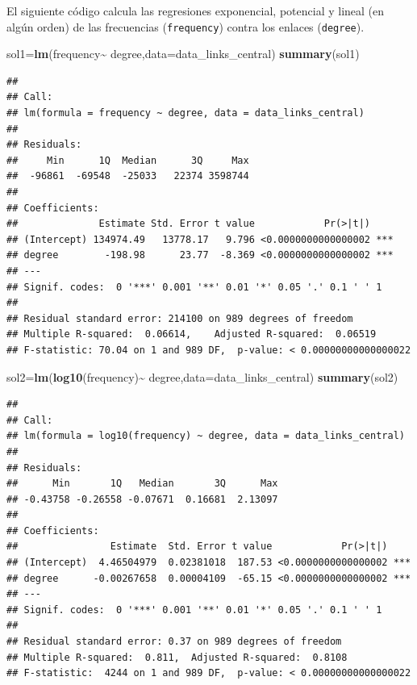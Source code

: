 \documentclass[
]{article}
\newenvironment{Shaded}{\begin{snugshade}}{\end{snugshade}}
\newcommand{\DataTypeTok}[1]{\textcolor[rgb]{0.13,0.29,0.53}{#1}}
\newcommand{\KeywordTok}[1]{\textcolor[rgb]{0.13,0.29,0.53}{\textbf{#1}}}
\newcommand{\NormalTok}[1]{#1}
\newcommand{\OperatorTok}[1]{\textcolor[rgb]{0.81,0.36,0.00}{\textbf{#1}}}
\newcommand{\StringTok}[1]{\textcolor[rgb]{0.31,0.60,0.02}{#1}}
\begin{document}
El siguiente código calcula las regresiones exponencial, potencial y
lineal (en algún orden) de las frecuencias (\texttt{frequency}) contra
los enlaces (\texttt{degree}).

\begin{Shaded}
\begin{Highlighting}[]
\NormalTok{sol1=}\KeywordTok{lm}\NormalTok{(frequency}\OperatorTok{\textasciitilde{}}\StringTok{ }\NormalTok{degree,}\DataTypeTok{data=}\NormalTok{data\_links\_central)}
\KeywordTok{summary}\NormalTok{(sol1)}
\end{Highlighting}
\end{Shaded}

\begin{verbatim}
## 
## Call:
## lm(formula = frequency ~ degree, data = data_links_central)
## 
## Residuals:
##     Min      1Q  Median      3Q     Max 
##  -96861  -69548  -25033   22374 3598744 
## 
## Coefficients:
##              Estimate Std. Error t value            Pr(>|t|)    
## (Intercept) 134974.49   13778.17   9.796 <0.0000000000000002 ***
## degree        -198.98      23.77  -8.369 <0.0000000000000002 ***
## ---
## Signif. codes:  0 '***' 0.001 '**' 0.01 '*' 0.05 '.' 0.1 ' ' 1
## 
## Residual standard error: 214100 on 989 degrees of freedom
## Multiple R-squared:  0.06614,    Adjusted R-squared:  0.06519 
## F-statistic: 70.04 on 1 and 989 DF,  p-value: < 0.00000000000000022
\end{verbatim}

\begin{Shaded}
\begin{Highlighting}[]
\NormalTok{sol2=}\KeywordTok{lm}\NormalTok{(}\KeywordTok{log10}\NormalTok{(frequency)}\OperatorTok{\textasciitilde{}}\StringTok{ }\NormalTok{degree,}\DataTypeTok{data=}\NormalTok{data\_links\_central)}
\KeywordTok{summary}\NormalTok{(sol2)}
\end{Highlighting}
\end{Shaded}

\begin{verbatim}
## 
## Call:
## lm(formula = log10(frequency) ~ degree, data = data_links_central)
## 
## Residuals:
##      Min       1Q   Median       3Q      Max 
## -0.43758 -0.26558 -0.07671  0.16681  2.13097 
## 
## Coefficients:
##                Estimate  Std. Error t value            Pr(>|t|)    
## (Intercept)  4.46504979  0.02381018  187.53 <0.0000000000000002 ***
## degree      -0.00267658  0.00004109  -65.15 <0.0000000000000002 ***
## ---
## Signif. codes:  0 '***' 0.001 '**' 0.01 '*' 0.05 '.' 0.1 ' ' 1
## 
## Residual standard error: 0.37 on 989 degrees of freedom
## Multiple R-squared:  0.811,  Adjusted R-squared:  0.8108 
## F-statistic:  4244 on 1 and 989 DF,  p-value: < 0.00000000000000022
\end{verbatim}
\end{document}
